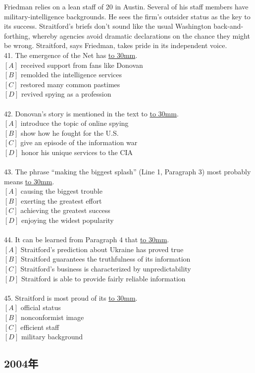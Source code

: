 \documentclass[a4paper]{article}
\begin{document}
\par
Friedman relies on a lean staff of 20 in Austin. Several of his staff members have military-intelligence backgrounds. He sees the firm’s outsider status as the key to its success. Straitford’s briefs don’t sound like the usual Washington back-and-forthing, whereby agencies avoid dramatic declarations on the chance they might be wrong. Straitford, says Friedman, takes pride in its independent voice.
\\41.	The emergence of the Net has \underline{\hbox to 30mm{}}.\\$[A]$ received support from fans like Donovan\\$[B]$ remolded the intelligence services\\$[C]$ restored many common pastimes\\$[D]$ revived spying as a profession\\\\42.	Donovan’s story is mentioned in the text to \underline{\hbox to 30mm{}}.\\$[A]$ introduce the topic of online spying\\$[B]$ show how he fought for the U.S.\\$[C]$ give an episode of the information war\\$[D]$ honor his unique services to the CIA\\\\43.	The phrase “making the biggest splash” (Line 1, Paragraph 3) most probably means \underline{\hbox to 30mm{}}.\\$[A]$ causing the biggest trouble\\$[B]$ exerting the greatest effort\\$[C]$ achieving the greatest success\\$[D]$ enjoying the widest popularity\\\\44.	It can be learned from Paragraph 4 that \underline{\hbox to 30mm{}}.\\$[A]$ Straitford’s prediction about Ukraine has proved true\\$[B]$ Straitford guarantees the truthfulness of its information\\$[C]$ Straitford’s business is characterized by unpredictability\\$[D]$ Straitford is able to provide fairly reliable information\\\\45.	Straitford is most proud of its \underline{\hbox to 30mm{}}.\\$[A]$ official status\\$[B]$ nonconformist image\\$[C]$ efficient staff\\$[D]$ military background\\\subsection{2004年}
\end{document}
